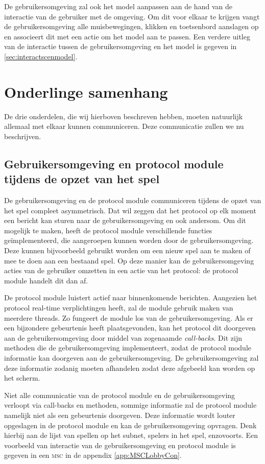 \documentclass[a4paper,11pt]{article}
\begin{document}
	De gebruikersomgeving zal ook het model aanpassen aan de hand van de interactie van de gebruiker met de omgeving. Om dit voor elkaar te krijgen vangt de gebruikersomgeving alle muisbewegingen, klikken en toetsenbord aanslagen op en associeert dit met een actie om het model aan te passen. Een verdere uitleg van de interactie tussen de gebruikersomgeving en het model is gegeven in \ref{sec:interactscenmodel}.

    \section{Onderlinge samenhang}
    De drie onderdelen, die wij hierboven beschreven hebben, moeten natuurlijk allemaal met elkaar kunnen communiceren. Deze communicatie zullen we nu beschrijven.
    
    \subsection{Gebruikersomgeving en protocol module tijdens de opzet van het spel}
    De gebruikersomgeving en de protocol module communiceren tijdens de opzet van het spel compleet asymmetrisch. Dat wil zeggen dat het protocol op elk moment een bericht kan sturen naar de gebruikersomgeving en ook andersom. Om dit mogelijk te maken, heeft de protocol module verschillende functies ge\"implementeerd, die aangeroepen kunnen worden door de gebruikersomgeving. Deze kunnen bijvoorbeeld gebruikt worden om een nieuw spel aan te maken of mee te doen aan een bestaand spel. Op deze manier kan de gebruikersomgeving acties van de gebruiker omzetten in een actie van het protocol: de protocol module handelt dit dan af.

    De protocol module luistert actief naar binnenkomende berichten. Aangezien het protocol real-time verplichtingen heeft, zal de module gebruik maken van meerdere threads. Zo fungeert de module los van de gebruikersomgeving. Als er een bijzondere gebeurtenis heeft plaatsgevonden, kan het protocol dit doorgeven aan de gebruikersomgeving door middel van zogenaamde \emph{call-backs}. Dit zijn methoden die de gebruikersomgeving implementeert, zodat de protocol module informatie kan doorgeven aan de gebruikersomgeving. De gebruikersomgeving zal deze informatie zodanig moeten afhandelen zodat deze afgebeeld kan worden op het scherm.

    Niet alle communicatie van de protocol module en de gebruikersomgeving verloopt via call-backs en methoden, sommige informatie zal de protocol module namelijk niet als een gebeurtenis doorgeven. Deze informatie wordt louter opgeslagen in de protocol module en kan de gebruikersomgeving opvragen. Denk hierbij aan de lijst van spellen op het subnet, spelers in het spel, enzovoorts. Een voorbeeld van interactie van de gebruikersomgeving en protocol module is gegeven in een \textsc{msc} in de appendix \ref{app:MSCLobbyCon}.
    
\end{document}
